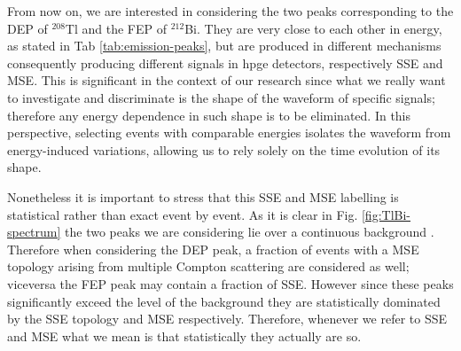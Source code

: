 From now on, we are interested in considering the two peaks corresponding to the \ac{DEP} of ${}^{208}$Tl and the \ac{FEP} of ${}^{212}$Bi. They are very close to each other in energy, as stated in Tab \ref{tab:emission-peaks}, but are produced in different mechanisms consequently producing different signals in \ac{hpge} detectors, respectively \ac{SSE} and \ac{MSE}. This is significant in the context of our research since what we really want to investigate and discriminate is the shape of the waveform of specific signals; therefore any energy dependence in such shape is to be eliminated. In this perspective, selecting events with comparable energies isolates the waveform from energy-induced variations, allowing us to rely solely on the time evolution of its shape. 

Nonetheless it is important to stress that this \ac{SSE} and \ac{MSE} labelling is statistical rather than exact event by event. As it is clear in Fig. \ref{fig:TlBi-spectrum} the two peaks we are considering lie over a continuous background . Therefore when considering the \ac{DEP} peak, a fraction of events with a \ac{MSE} topology arising from multiple Compton scattering are considered as well; viceversa the \ac{FEP} peak may contain a fraction of \ac{SSE}. However since these peaks significantly exceed the level of the background they are statistically dominated by the \ac{SSE} topology and \ac{MSE} respectively. Therefore, whenever we refer to \ac{SSE} and \ac{MSE} what we mean is that statistically they actually are so. 
